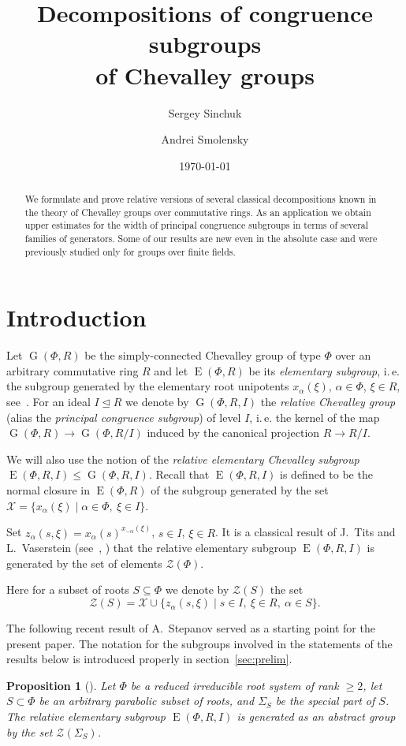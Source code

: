 \documentclass[oneside, 12pt]{amsart}
\title [Decompositions of congruence subgroups of Chevalley groups] {Decompositions of congruence subgroups \\ of Chevalley groups}
\author{Sergey Sinchuk}
\author{Andrei Smolensky}
\date {\today}
\theoremstyle{plain}
\numberwithin{equation}{section}
\numberwithin{lemma}{section}
\newtheorem{prop}[lemma]{Proposition}
\theoremstyle{definition}
\theoremstyle{remark}
\DeclareMathOperator{\G}{G}
\DeclareMathOperator{\E}{E}
\begin{document}
\begin{abstract} 
We formulate and prove relative versions of several classical decompositions known in the theory of Chevalley groups over commutative rings.
As an application we obtain upper estimates for the width of principal congruence subgroups in terms of several families of generators.
Some of our results are new even in the absolute case and were previously studied only for groups over finite fields.
\end{abstract}

\maketitle

\section{Introduction}\label{sec:intro}
Let $\G(\Phi, R)$ be the simply-connected Chevalley group of type $\Phi$ over an arbitrary commutative ring $R$ and let $\E(\Phi, R)$ be its \emph{elementary subgroup},
i.\,e. the subgroup generated by the elementary root unipotents $x_\alpha(\xi)$, $\alpha\in\Phi$, $\xi\in R$, see~\cite{VP, St78, S}.
For an ideal $I \trianglelefteq R$ we denote by $\G(\Phi, R, I)$ the \emph{relative Chevalley group} (alias the \emph{principal congruence subgroup}) of level $I$, 
i.\,e. the kernel of the map $\G(\Phi, R)\rightarrow\G(\Phi, R/I)$ induced by the canonical projection $R\rightarrow R/I$.

We will also use the notion of the \emph{relative elementary Chevalley subgroup} $\E(\Phi, R, I) \leqslant \G(\Phi, R, I)$.
Recall that $\E(\Phi, R, I)$ is defined to be the normal closure in $\E(\Phi, R)$ of the subgroup generated by the set $\mathcal{X} = \{x_\alpha(\xi) \mid \alpha\in \Phi, \ \xi \in I \}$.

Set $z_\alpha(s, \xi) = x_{\alpha}(s)^{x_{-\alpha}(\xi)}$, $s\in I$, $\xi\in R$.
It is a classical result of J.~Tits and L.~Vaserstein (see~\cite{Tits76}, \cite[Theorem~2]{Va86}) that the relative elementary subgroup $\E(\Phi, R, I)$ is generated by
the set of elements $\mathcal{Z}(\Phi)$.

Here for a subset of roots $S\subseteq\Phi$ we denote by $\mathcal{Z}(S)$ the set
\[ \mathcal{Z}(S) =  \mathcal{X} \cup \{ z_\alpha(s, \xi) \mid s\in I, \ \xi \in R, \ \alpha \in S\}.\]

The following recent result of A.~Stepanov served as a starting point for the present paper.
The notation for the subgroups involved in the statements of the results below is introduced properly in section~\ref{sec:prelim}.
\begin{prop}[{\cite[Theorem~3.4]{S}}] \label{prop:Stepanov}
Let $\Phi$ be a reduced irreducible root system of rank $\geq 2$, let $S \subset \Phi$ be an arbitrary parabolic subset of roots, and $\Sigma_S$ be the special part of $S$. The relative elementary subgroup $\E(\Phi, R, I)$ is generated as an abstract group by the set $\mathcal{Z}(\Sigma_S)$. \end{prop}
\end{document}
